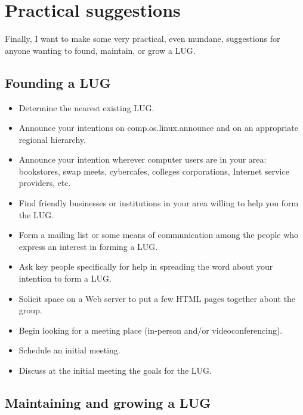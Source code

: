 

\section{Practical suggestions}

Finally, I want to make some very practical, even mundane, suggestions
for anyone wanting to found, maintain, or grow a LUG.






\subsection{Founding a LUG}



\begin{itemize}
\item Determine the nearest existing LUG.
\item Announce your intentions on {\ttfamily comp.os.linux.announce} and on an appropriate regional hierarchy.
\item Announce your intention wherever computer users are in your area: bookstores, swap meets, cybercafes, colleges corporations, Internet service providers, etc.
\item Find friendly businesses or institutions in your area willing to help you form the LUG.
\item Form a mailing list or some means of communication among the people who express an interest in forming a LUG.
\item Ask key people specifically for help in spreading the word about your intention to form a LUG.
\item Solicit space on a Web server to put a few HTML pages together about the group.
\item Begin looking for a meeting place (in-person and/or videoconferencing).
\item Schedule an initial meeting.
\item Discuss at the initial meeting the goals for the LUG.
\end{itemize}





\subsection{Maintaining and growing a LUG}



